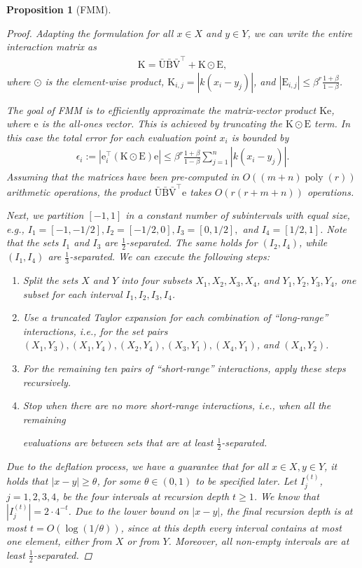 \documentclass{article}
\newtheorem{proposition}{Proposition}[section]
\DeclareMathOperator{\poly}{poly}
\newcommand\vece{\boldsymbol{\mathrm{e}}}
\newcommand\matE{\boldsymbol{\mathrm{E}}}
\newcommand\matK{\boldsymbol{\mathrm{K}}}
\newcommand\matBbar{\bar{\boldsymbol{\mathrm{B}}}}
\newcommand\matUbar{\bar{\boldsymbol{\mathrm{U}}}}
\newcommand\matVbar{\bar{\boldsymbol{\mathrm{V}}}}
\begin{document}
\begin{proposition}[FMM]
\begin{proof}
    Adapting the formulation for all $x\in X$ and $y\in Y$, we can write the entire interaction matrix as
    \begin{align*}
        \matK=\matUbar\matBbar\matVbar^\top + \matK\odot \matE,
    \end{align*}
    where $\odot$ is the element-wise product, $\matK_{i,j}=|k(x_i-y_j)|$, and $|\matE_{i,j}|\leq \beta^r\frac{1+\beta}{1-\beta}$.

    The goal of FMM is to efficiently approximate the matrix-vector product $\matK\vece$, where $\vece$ is the all-ones vector. This is achieved by truncating the $\matK\odot \matE$ term. In this case the total error for each evaluation point $x_i$ is bounded by 
    \begin{align}
        \label{eq:fmm_elementwise_error_bound}
        \epsilon_i := |\vece_i^\top(\matK\odot \matE)\vece| \leq \beta^r\frac{1+\beta}{1-\beta}\sum_{j=1}^{n}|k(x_i-y_j)|.
    \end{align}
    Assuming that the matrices have been pre-computed in $O((m+n)\poly(r))$ arithmetic operations, the product $\matUbar\matBbar\matVbar^\top \vece$ takes $O(r(r+m+n))$ operations.

    Next, we partition $[-1,1]$ in a constant number of subintervals with equal size, e.g., $I_1=[-1,-1/2], I_2=[-1/2,0], I_3=[0,1/2],$ and $I_4=[1/2,1]$. 
    Note that the sets $I_1$ and $I_3$ are $\frac{1}{2}$-separated. The same holds for $(I_2,I_4)$, while $(I_1,I_4)$ are $\frac{1}{3}$-separated. We can execute the following steps:
    \begin{enumerate}
        \item Split the sets $X$ and $Y$ into four subsets $X_1,X_2,X_3,X_4$, and  $Y_1,Y_2,Y_3,Y_4$, one subset for each interval $I_1,I_2,I_3,I_4$.
        \item Use a truncated Taylor expansion for each combination of ``long-range'' interactions, i.e., for the  set pairs $(X_1,Y_3),(X_1,Y_4), (X_2,Y_4), (X_3, Y_1), (X_4, Y_1)$, and $(X_4,Y_2)$.
        \item For the remaining ten pairs of ``short-range'' interactions, apply these steps recursively.
        \item Stop when  there are no more short-range interactions, i.e., when all the remaining 
        
        evaluations are between sets that are at least $\frac{1}{2}$-separated.
    \end{enumerate}

    Due to the deflation process, we have a guarantee that for \emph{all} $x\in X,y\in Y$, it holds that $|x-y|\geq \theta$, for some $\theta\in(0,1)$ to be specified later. Let $I^{(t)}_j$, $j=1,2,3,4$, be the four intervals at recursion depth $t\geq 1$. We know that $|I_j^{(t)}|=2\cdot4^{-t}$. Due to the lower bound on $|x-y|$, the final recursion depth is at most $t=O(\log(1/\theta))$, since at this depth every interval contains at most one element, either from $X$ or from $Y$. Moreover, all non-empty intervals are at least $\frac{1}{2}$-separated. 


\end{proof}
\end{proposition}
\end{document}
